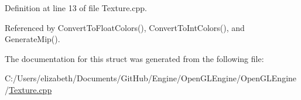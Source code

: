 Definition at line 13 of file Texture.\+cpp.



Referenced by Convert\+To\+Float\+Colors(), Convert\+To\+Int\+Colors(), and Generate\+Mip().



The documentation for this struct was generated from the following file\+:\begin{DoxyCompactItemize}
\item 
C\+:/\+Users/elizabeth/\+Documents/\+Git\+Hub/\+Engine/\+Open\+G\+L\+Engine/\+Open\+G\+L\+Engine/\hyperlink{_texture_8cpp}{Texture.\+cpp}\end{DoxyCompactItemize}

